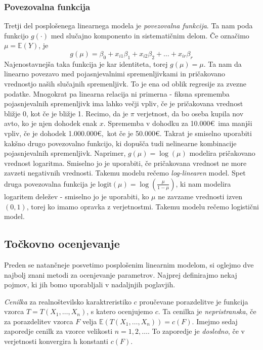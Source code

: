 \documentclass[12pt,a4paper]{amsart}
\theoremstyle{definition} %
\theoremstyle{plain} %
\begin{document}
\subsubsection{Povezovalna funkcija}
Tretji del posplošenega linearnega modela je \textit{povezovalna funkcija}. Ta nam poda funkcijo $g(\cdot)$ med slučajno komponento
in sistematičnim delom. Če označimo $\mu = \mathbb{E}(Y)$, je
\[
    g(\mu) = \beta_{0} + x_{i1}\beta_{1} + x_{i2}\beta_{2} + \ldots + x_{ir}\beta_{r}
\]
Najenostavnejša taka funkcija je kar identiteta, torej $g(\mu) = \mu$. Ta nam da linearno povezavo med pojasnjevalnimi spremenljivkami 
in pričakovano vrednostjo naših slučajnih spremenljivk. To je ena od oblik regresije za zvezne podatke.
Mnogokrat pa linearna relacija ni primerna - fiksna sprememba pojasnjevalnih spremenljivk ima lahko večji vpliv, če je pričakovana vrednost 
bližje 0, kot če je bližje 1. Recimo, da je $\pi$ verjetnost, da bo oseba kupila nov avto, ko je njen dohodek enak $x$. Sprememba v dohodku
za 10.000\euro~ima manjši vpliv, če je dohodek 1.000.000\euro,~kot če je 50.000\euro.
Takrat je smiselno uporabiti kakšno drugo povezovalno funkcijo, ki dopušča tudi nelinearne kombinacije pojasnjevalnih
spremenljivk. Naprimer, $g(\mu) = \log(\mu)$ modelira
pričakovano vrednost logaritma. Smiselno jo je uporabiti, če pričakovana vrednost ne more zavzeti negativnih vrednosti. Takemu modelu rečemo
\textit{log-linearen} model.
Spet druga povezovalna funkcija je $\mathrm{logit}(\mu) = \log(\frac{\mu}{1-\mu})$, ki nam modelira logaritem deležev - smiselno jo je uporabiti, 
ko $\mu$ ne zavzame vrednosti izven $(0,1)$, torej ko imamo opravka z verjetnostmi. Takemu modelu rečemo logistični model.
\subsection{Točkovno ocenjevanje}
Preden se natančneje posvetimo posplošenim linearnim modelom, si oglejmo dve najbolj znani metodi za ocenjevanje parametrov.
Najprej definirajmo nekaj pojmov, ki jih bomo uporabljali v nadaljnjih poglavjih.

\textit{Cenilka} za realnoštevilsko karaktreristiko $c$ proučevane porazdelitve je funkcija vzorca $T=T(X_{1},\ldots,X_{n})$, s katero ocenjujemo $c.$
Ta cenilka je \textit{nepristranska}, če za porazdelitev vzorca $F$ velja $\mathbb{E}(T(X_{1},\ldots,X_{n})) = c(F).$
Imejmo sedaj zaporedje cenilk za vzorce velikosti $n=1,2,\ldots.$ To zaporedje je \textit{dosledno}, če v verjetnosti konvergira h konstanti $c(F).$
\end{document}
